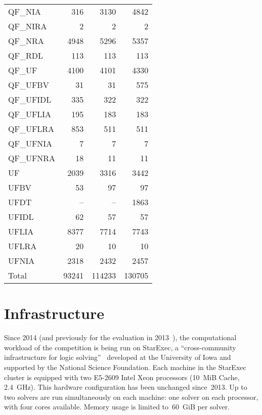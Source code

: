 \documentclass[twoside,11pt]{article}
\begin{document}
\begin{table}
{\begin{tabular}{|l|r|r|r|}
    QF\_NIA    &    316 &   3130 &   4842 \\
    QF\_NIRA   &      2 &      2 &      2 \\
    QF\_NRA    &   4948 &   5296 &   5357 \\
    QF\_RDL    &    113 &    113 &    113 \\
    QF\_UF     &   4100 &   4101 &   4330 \\
    QF\_UFBV   &     31 &     31 &    575 \\
    QF\_UFIDL  &    335 &    322 &    322 \\
    QF\_UFLIA  &    195 &    183 &    183 \\
    QF\_UFLRA  &    853 &    511 &    511 \\
    QF\_UFNIA  &      7 &      7 &      7 \\
    QF\_UFNRA  &     18 &     11 &     11 \\
    UF         &   2039 &   3316 &   3442 \\
    UFBV       &     53 &     97 &     97 \\
    UFDT       &     -- &     -- &   1863 \\
    UFIDL      &     62 &     57 &     57 \\
    UFLIA      &   8377 &   7714 &   7743 \\
    UFLRA      &     20 &     10 &     10 \\
    UFNIA      &   2318 &   2432 &   2457 \\
    \hline
    Total      &  93241 & 114233 & 130705 \\
    \hline
  \end{tabular}}
\end{table}


\section{Infrastructure}
\label{sec:starexec}

Since 2014 (and previously for the evaluation in 2013~\cite{CSW15}),
the computational workload of the competition is being run on
StarExec, a ``cross-community infrastructure for logic
solving''~\cite{DBLP:conf/cade/StumpST14} developed at the University
of Iowa and supported by the National Science Foundation.  Each
machine in the StarExec cluster is equipped with two E5-2609 Intel
Xeon processors (10~MiB Cache, 2.4~GHz).  This hardware configuration
has been unchanged since~2013.  Up to two solvers are run
simultaneously on each machine: one solver on each processor, with
four cores available.  Memory usage is limited to~60~GiB per solver.
\end{document}
